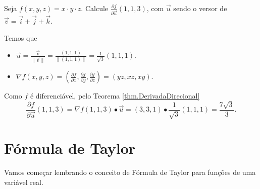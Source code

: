 \begin{example}
    Seja \(f(x,y,z) = x\cdot y\cdot z\). Calcule \(\frac{\partial f}{\partial \overrightarrow{u}}(1,1,3)\), com \(\overrightarrow{u}\) sendo o versor de \(\overrightarrow{v} = \overrightarrow{i} + \overrightarrow{j} + \overrightarrow{k}\).

    Temos que
        \begin{itemize}
            \item \(\overrightarrow{u} = \frac{\overrightarrow{v}}{\|\overrightarrow{v}\|} = \frac{(1,1,1)}{\|(1,1,1)\|} = \frac{1}{\sqrt{3}}(1,1,1) \).
            \item \(\nabla f(x,y,z) = \left( \frac{\partial f}{\partial x}, \frac{\partial f}{\partial y}, \frac{\partial f}{\partial z} \right) = (yz, xz, xy)\).
        \end{itemize}
    
    Como \(f\) é diferenciável, pelo Teorema \ref{thm.DerivadaDirecional} \[\frac{\partial f}{\partial \overrightarrow{u}}(1,1,3) = \nabla f(1,1,3)\bullet\overrightarrow{u} = (3,3,1)\bullet \frac{1}{\sqrt{3}}(1,1,1) = \frac{7\sqrt{3}}{3}.\]
\end{example}

\section{Fórmula de Taylor}

Vamos começar lembrando o conceito de Fórmula de Taylor para funções de uma variável real.

